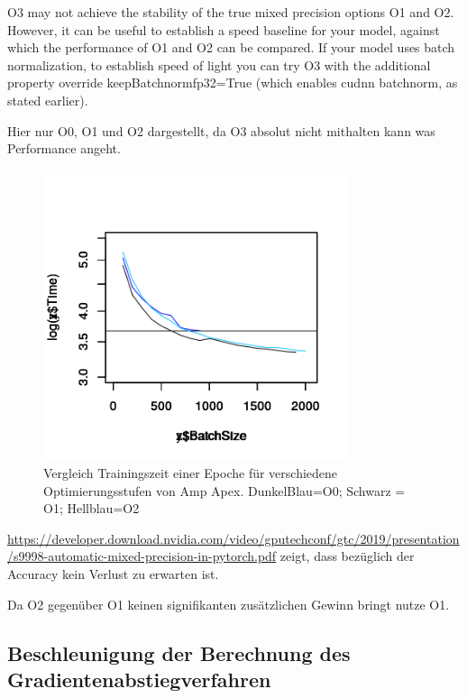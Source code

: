 O3
may not achieve the stability of the true mixed precision options O1 and O2. However, it can be useful to establish a speed baseline for your model, against which the performance of O1 and O2 can be compared. If your model uses batch normalization, to establish speed of light you can try O3 with the additional property override keepBatchnormfp32=True (which enables cudnn batchnorm, as stated earlier).

Hier nur O0, O1 und O2 dargestellt, da O3 absolut nicht mithalten kann was Performance angeht.

\begin{figure}[h]
 \centering
 \includegraphics[width=0.8\textwidth]{KapitelPartB/Images/timeVsBatchSize_Amp.png}
 \caption{Vergleich Trainingszeit einer Epoche für verschiedene Optimierungsstufen von Amp Apex. DunkelBlau=O0; Schwarz = O1; Hellblau=O2}
 \label{fig:amp}
\end{figure}

\url{https://developer.download.nvidia.com/video/gputechconf/gtc/2019/presentation/s9998-automatic-mixed-precision-in-pytorch.pdf} zeigt, dass bezüglich der Accuracy kein Verlust zu erwarten ist.

Da O2 gegenüber O1 keinen signifikanten zusätzlichen Gewinn bringt nutze O1.
\subsection{Beschleunigung der Berechnung des Gradientenabstiegverfahren}


